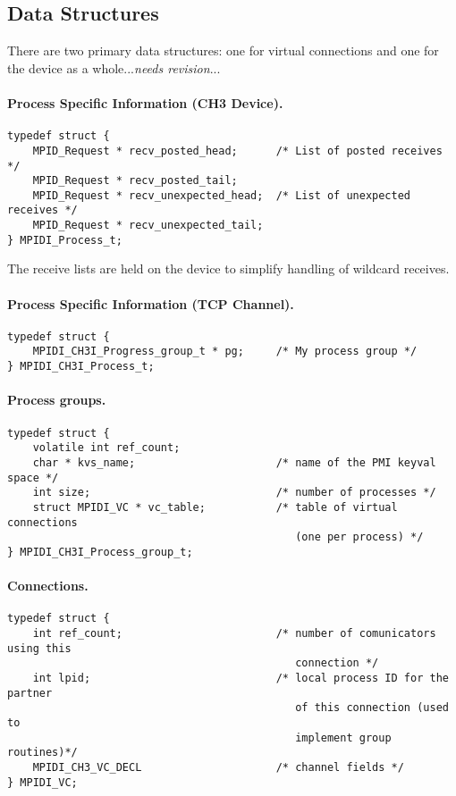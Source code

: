 \documentclass{article}
\begin{document}
\subsection{Data Structures}
There are two primary data structures: one for virtual connections and one for
the device as a whole...\emph{needs revision}...

\paragraph{Process Specific Information (CH3 Device).}
\begin{verbatim}
typedef struct {
    MPID_Request * recv_posted_head;      /* List of posted receives */
    MPID_Request * recv_posted_tail;
    MPID_Request * recv_unexpected_head;  /* List of unexpected receives */
    MPID_Request * recv_unexpected_tail;
} MPIDI_Process_t;
\end{verbatim}
The receive lists are held on the device to simplify handling of wildcard
receives.  

\paragraph{Process Specific Information (TCP Channel).}
\begin{verbatim}
typedef struct {
    MPIDI_CH3I_Progress_group_t * pg;     /* My process group */
} MPIDI_CH3I_Process_t;
\end{verbatim}

\paragraph{Process groups.}
\begin{verbatim}
typedef struct {
    volatile int ref_count;
    char * kvs_name;                      /* name of the PMI keyval space */
    int size;                             /* number of processes */
    struct MPIDI_VC * vc_table;           /* table of virtual connections
                                             (one per process) */
} MPIDI_CH3I_Process_group_t;
\end{verbatim}

\paragraph{Connections.}
\begin{verbatim}
typedef struct { 
    int ref_count;                        /* number of comunicators using this
                                             connection */
    int lpid;                             /* local process ID for the partner
                                             of this connection (used to
                                             implement group routines)*/
    MPIDI_CH3_VC_DECL                     /* channel fields */
} MPIDI_VC;
\end{verbatim}
\end{document}
